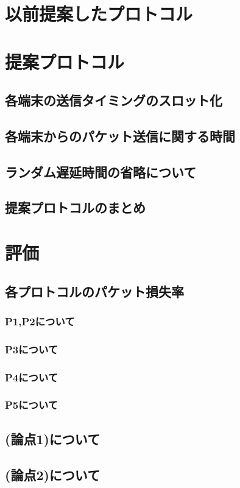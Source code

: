 \documentclass[12pt]{jreport}
\begin{document}
\chapter{以前提案したプロトコル}
\chapter{提案プロトコル}
\section{各端末の送信タイミングのスロット化}
\section{各端末からのパケット送信に関する時間}
\section{ランダム遅延時間の省略について}
\section{提案プロトコルのまとめ}

\chapter{評価}
\section{各プロトコルのパケット損失率}
\subsection{P1,P2について}
\subsection{P3について}
\subsection{P4について}
\subsection{P5について}
\section{(論点1)について}
\section{(論点2)について}
\end{document}
